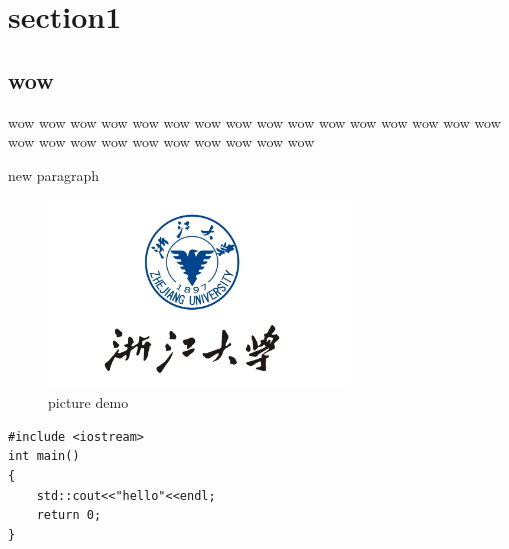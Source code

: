 \newpage
\section{section1}
\subsection{wow}
wow wow wow wow wow wow wow wow wow wow wow wow wow wow wow wow wow wow wow
wow wow wow wow wow wow wow
\par
new paragraph
\\
\begin{figure}[h] %
    \centering
    \includegraphics[width=8cm]{title/logo.png} %
    \caption{picture demo}           %
\end{figure}

\par
\lstset{language=C++}
\begin{lstlisting}[caption = code demo]
#include <iostream>
int main()
{
    std::cout<<"hello"<<endl;
    return 0;
}
\end{lstlisting}